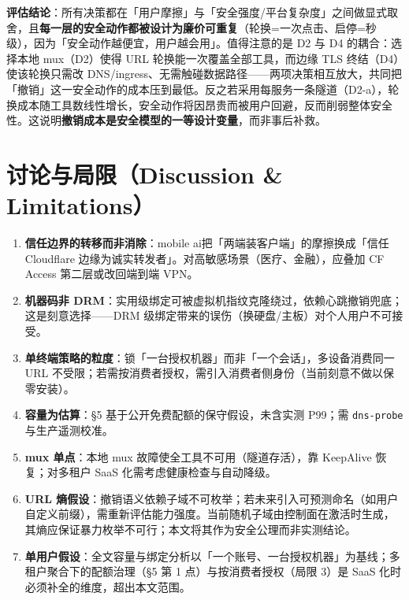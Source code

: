 \documentclass[10pt,a4paper]{article}
\newcommand{\sys}{mobile ai}
\begin{document}
\noindent\textbf{评估结论}：所有决策都在「用户摩擦」与「安全强度/平台复杂度」之间做显式取舍，且\textbf{每一层的安全动作都被设计为廉价可重复}（轮换=一次点击、启停=秒级），因为「安全动作越便宜，用户越会用」。值得注意的是 D2 与 D4 的耦合：选择本地 mux（D2）使得 URL 轮换能一次覆盖全部工具，而边缘 TLS 终结（D4）使该轮换只需改 DNS/ingress、无需触碰数据路径——两项决策相互放大，共同把「撤销」这一安全动作的成本压到最低。反之若采用每服务一条隧道（D2-a），轮换成本随工具数线性增长，安全动作将因昂贵而被用户回避，反而削弱整体安全性。这说明\textbf{撤销成本是安全模型的一等设计变量}，而非事后补救。

\section{讨论与局限（Discussion \& Limitations）}

\begin{enumerate}[leftmargin=1.6em,itemsep=0.35em,topsep=0.4em]
  \item \textbf{信任边界的转移而非消除}：\sys 把「两端装客户端」的摩擦换成「信任 Cloudflare 边缘为诚实转发者」。对高敏感场景（医疗、金融），应叠加 CF Access 第二层或改回端到端 VPN。
  \item \textbf{机器码非 DRM}：实用级绑定可被虚拟机指纹克隆绕过，依赖心跳撤销兜底；这是刻意选择——DRM 级绑定带来的误伤（换硬盘/主板）对个人用户不可接受。
  \item \textbf{单终端策略的粒度}：锁「一台授权机器」而非「一个会话」，多设备消费同一 URL 不受限；若需按消费者授权，需引入消费者侧身份（当前刻意不做以保零安装）。
  \item \textbf{容量为估算}：§5 基于公开免费配额的保守假设，未含实测 P99；需 \texttt{dns-probe} 与生产遥测校准。
  \item \textbf{mux 单点}：本地 mux 故障使全工具不可用（隧道存活），靠 KeepAlive 恢复；对多租户 SaaS 化需考虑健康检查与自动降级。
  \item \textbf{URL 熵假设}：撤销语义依赖子域不可枚举；若未来引入可预测命名（如用户自定义前缀），需重新评估能力强度。当前随机子域由控制面在激活时生成，其熵应保证暴力枚举不可行；本文将其作为安全公理而非实测结论。
  \item \textbf{单用户假设}：全文容量与绑定分析以「一个账号、一台授权机器」为基线；多租户聚合下的配额治理（§5 第 1 点）与按消费者授权（局限 3）是 SaaS 化时必须补全的维度，超出本文范围。
\end{enumerate}

\end{document}
